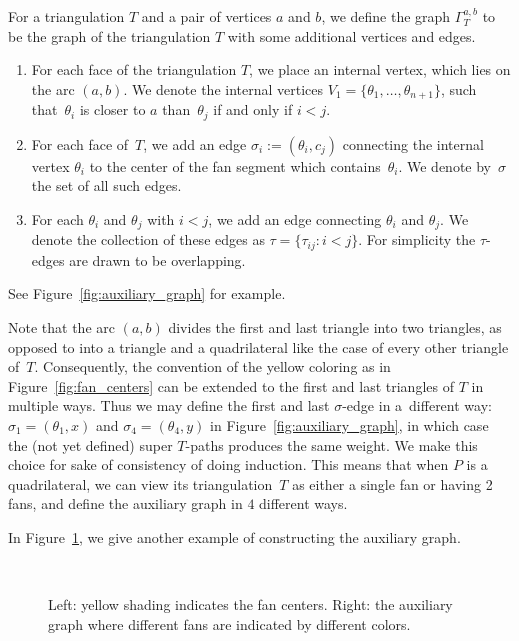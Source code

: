 \documentclass[pdftex]{sigma}
\numberwithin{equation}{section}
\begin{document}
For a triangulation $T$ and a pair of vertices $a$ and $b$, we define the graph $\Gamma_T^{a,b}$ to be the graph of the triangulation $T$ with some additional vertices and edges.
\begin{enumerate}\itemsep=0pt
 \item For each face of the triangulation $T$, we place an internal vertex, which lies on the arc $(a,b)$.
 We denote the internal vertices $V_1=\{\theta_1,\dots,\theta_{n+1}\}$, such that~$\theta_i$ is closer to $a$ than~$\theta_j$ if and only if $i<j$.

 \item For each face of~$T$, we add an edge $\sigma_i := (\theta_i, c_j)$ connecting the internal vertex $\theta_i$ to the center of the fan segment which contains~$\theta_i$.
 We denote by~$\sigma$ the set of all such edges.

 \item For each $\theta_i$ and $\theta_j$ with $i<j$, we add an edge connecting $\theta_i$ and $\theta_j$.
 We denote the collection of these edges as $\tau = \{\tau_{ij}\colon i<j\}$. For simplicity the $\tau$-edges are drawn to be overlapping.
\end{enumerate}
See Figure~\ref{fig:auxiliary_graph} for example.


\begin{Remark}\rm
 Note that the arc $(a,b)$ divides the first and last triangle into two triangles, as opposed to into a triangle and a quadrilateral
 like the case of every other triangle of~$T$. Consequently, the convention of the yellow coloring as in Figure~\ref{fig:fan_centers}
 can be extended to the first and last triangles of $T$ in multiple ways.
 Thus we may define the first and last $\sigma$-edge in a~different way: $\sigma_1=(\theta_1,x)$ and $\sigma_4=(\theta_4,y)$ in Figure~\ref{fig:auxiliary_graph},
 in which case the (not yet defined) super $T$-paths produces the same weight. We make this choice for sake of consistency of doing induction.
 This means that when $P$ is a quadrilateral, we can view its triangulation~$T$ as either a single fan or having 2 fans, and define the auxiliary graph in $4$ different ways.
\end{Remark}
In Figure~\ref{fig:bigger_auxiliary_graph}, we give another example of constructing the auxiliary graph.

\begin{figure}[h!]
\centering
 \ \ 
\caption{Left: yellow shading indicates the fan centers. Right: the auxiliary graph where different fans are indicated by different colors.}
\label{fig:bigger_auxiliary_graph}
\end{figure}
\end{document}
